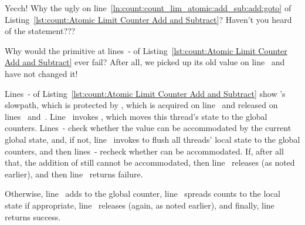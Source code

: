 \QuickQuiz{}
	Yecch!
	Why the ugly  on
        line~\ref{ln:count:count_lim_atomic:add_sub:add:goto} of
	Listing~\ref{lst:count:Atomic Limit Counter Add and Subtract}?
	Haven't you heard of the  statement???
 \QuickQuizEnd

\QuickQuiz{}
        \begin{lineref}
	Why would the  primitive at
        lines~- of
	Listing~\ref{lst:count:Atomic Limit Counter Add and Subtract}
	ever fail?
	After all, we picked up its old value on line~ and have not
	changed it!
	\end{lineref}
 \QuickQuizEnd

\begin{lineref}
Lines~- of
Listing~\ref{lst:count:Atomic Limit Counter Add and Subtract}
show 's slowpath, which is protected by ,
which is acquired on line~ and released on
lines~ and~.
Line~ invokes ,
which moves this thread's
state to the global counters.
Lines~- check whether
the  value can be accommodated by
the current global state, and, if not, line~ invokes
 to flush all threads' local state to the
global counters, and then
lines~- recheck whether  can
be accommodated.
If, after all that, the addition of  still cannot be accommodated,
then line~ releases  (as noted earlier), and
then line~ returns failure.

Otherwise, line~ adds  to the global counter,
line~
spreads counts to the local state if appropriate, line~ releases
 (again, as noted earlier), and finally,
line~
returns success.
\end{lineref}

